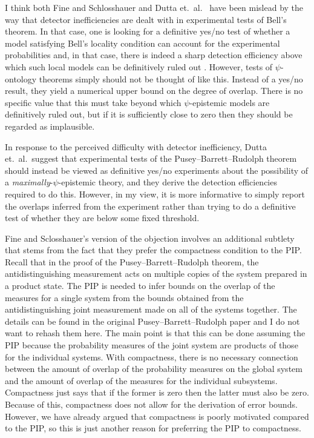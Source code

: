 \documentclass[DIV=calc,fontsize=12pt]{scrartcl} %
\theoremstyle{definition}
\theoremstyle{plain}
\begin{document}
I think both Fine and Schlosshauer \cite{Schlosshauer2012} and Dutta
et.\ al.\ \cite{Dutta2014} have been mislead by the way that detector
inefficiencies are dealt with in experimental tests of Bell's theorem.
In that case, one is looking for a definitive yes/no test of whether a
model satisfying Bell's locality condition can account for the
experimental probabilities and, in that case, there is indeed a sharp
detection efficiency above which such local models can be definitively
ruled out \cite{Eberhard1993}.  However, tests of $\psi$-ontology
theorems simply should not be thought of like this.  Instead of a
yes/no result, they yield a numerical upper bound on the degree of
overlap.  There is no specific value that this must take beyond which
$\psi$-epistemic models are definitively ruled out, but if it is
sufficiently close to zero then they should be regarded as
implausible.

In response to the perceived difficulty with detector inefficiency,
Dutta et.\ al.\ suggest that experimental tests of the Pusey--Barrett--Rudolph theorem
should instead be viewed as definitive yes/no experiments about the
possibility of a \emph{maximally}-$\psi$-epistemic theory, and they
derive the detection efficiencies required to do this.  However, in my
view, it is more informative to simply report the overlaps inferred
from the experiment rather than trying to do a definitive test of
whether they are below some fixed threshold.

Fine and Sclosshauer's version of the objection involves an additional
subtlety that stems from the fact that they prefer the compactness
condition to the PIP\@.  Recall that in the proof of the Pusey--Barrett--Rudolph theorem,
the antidistinguishing measurement acts on multiple copies of the
system prepared in a product state.  The PIP is needed to infer bounds
on the overlap of the measures for a single system from the bounds
obtained from the antidistinguishing joint measurement made on all of
the systems together.  The details can be found in the original Pusey--Barrett--Rudolph
paper \cite{Pusey2012} and I do not want to rehash them here.  The
main point is that this can be done assuming the PIP because the
probability measures of the joint system are products of those for the
individual systems.  With compactness, there is no necessary
connection between the amount of overlap of the probability measures
on the global system and the amount of overlap of the measures for the
individual subsystems.  Compactness just says that if the former is
zero then the latter must also be zero.  Because of this, compactness
does not allow for the derivation of error bounds.  However, we have
already argued that compactness is poorly motivated compared to the
PIP, so this is just another reason for preferring the PIP to
compactness.
\end{document}
